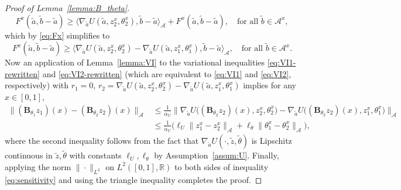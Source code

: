 \documentclass[11pt]{article}
\newcommand{\R}{{\mathbb R}}
\newcommand{\be}{\begin{equation}}
\newcommand{\ee}{\end{equation}}
\numberwithin{equation}{section}
\begin{document}
\begin{proof}[Proof of Lemma~\ref{lemma:B_theta}]
\be
F^x(\tilde a,\tilde b-\tilde a)\geq \langle \nabla_{\tilde a}U(\tilde{a},z_2^x,\theta_2^x), \tilde{b}- \tilde{a}\rangle_\mathcal{A}+F^x(\tilde a,\tilde b-\tilde a),\quad  \textrm{for all } \tilde{b}\in\mathcal{A}^x,
\ee
which by \eqref{eq:Fx} simplifies to 
\be\label{eq:VI2-rewritten}
F^x(\tilde a,\tilde b-\tilde a)\geq \langle \nabla_{\tilde a}U(\tilde{a},z_2^x,\theta_2^x)-\nabla_{\tilde a}U(\tilde{a},z_1^x,\theta_1^x), \tilde{b}- \tilde{a}\rangle_\mathcal{A},\quad  \textrm{for all } \tilde{b}\in\mathcal{A}^x.
\ee
Now an application of Lemma~\ref{lemma:VI} to the variational inequalities \eqref{eq:VI1-rewritten} and \eqref{eq:VI2-rewritten} (which are equivalent to \eqref{eq:VI1} and \eqref{eq:VI2}, respectively) with $r_1=0$, $r_2=\nabla_{\tilde a}U(\tilde{a},z_2^x,\theta_2^x)-\nabla_{\tilde a}U(\tilde{a},z_1^x,\theta_1^x)$ implies for any $x\in [0,1]$, 
\be\begin{aligned}\label{eq:sensitivity}
\|(\boldsymbol{B}_{\theta_1}z_1)(x)-(\boldsymbol{B}_{\theta_2}z_2)(x)\|_\mathcal{A}
&\leq \frac{1}{\alpha_U}\big\|\nabla_{\tilde a}U\big((\boldsymbol{B}_{\theta_2}z_2)(x),z_2^x,\theta_2^x\big)-\nabla_{\tilde a}U\big((\boldsymbol{B}_{\theta_2}z_2)(x),z_1^x,\theta_1^x\big) \big\|_\mathcal{A}\\
&\leq \frac{1}{\alpha_U}\big(\ell_U\|z_1^x-z_2^x\|_\mathcal{A}+\ell_\theta\|\theta_1^x-\theta_2^x \|_\mathcal{A} \big),
\end{aligned}\ee
where the second inequality follows from the fact that $\nabla_{\tilde a} U(\cdot,\tilde z,\tilde \theta)$ is Lipschitz continuous in $\tilde z,\tilde\theta$ with constants $\ell_U,\ell_\theta$ by Assumption~\ref{assum:U}. Finally, applying the norm $\|\cdot\|_{L^2}$ on $L^2([0,1],\R)$ to both sides of inequality \eqref{eq:sensitivity} and using the triangle inequality completes the proof. 


\end{proof}
\end{document}
